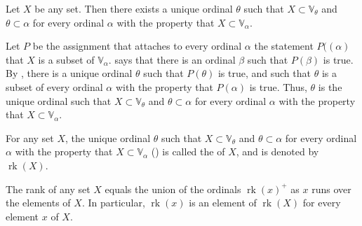 \documentclass{article}
\begin{document}
\begin{theorem}
  \label{thm:l7vz19h3}
  Let \(X\) be any set.  Then there exists a unique ordinal \(\theta\)
  such that \(X \subset \mathbb{V}_\theta\) and
  \(\theta \subset \alpha\) for every ordinal \(\alpha\) with the
  property that \(X \subset \mathbb{V}_\alpha\).
\end{theorem}

Let \(P\) be the assignment that attaches to every ordinal \(\alpha\)
the statement \(P((\alpha)\) that \(X\) is a subset of
\(\mathbb{V}_\alpha\).   says that there is an
ordinal \(\beta\) such that \(P(\beta)\) is true.  By
, there is a unique ordinal \(\theta\) such that
\(P(\theta)\) is true, and such that \(\theta\) is a subset of every
ordinal \(\alpha\) with the property that \(P(\alpha)\) is true.
Thus, \(\theta\) is the unique ordinal such that
\(X \subset \mathbb{V}_\theta\) and \(\theta \subset \alpha\) for
every ordinal \(\alpha\) with the property that
\(X \subset \mathbb{V}_\alpha\).

For any set \(X\), the unique ordinal \(\theta\) such that
\(X \subset \mathbb{V}_\theta\) and \(\theta \subset \alpha\) for
every ordinal \(\alpha\) with the property that
\(X \subset \mathbb{V}_\alpha\) () is called the
 of \(X\), and is denoted by \(\operatorname{rk}(X)\).

\begin{theorem}
  \label{thm:ok93sv3f}
  The rank of any set \(X\) equals the union of the ordinals
  \(\operatorname{rk}(x)^+\) as \(x\) runs over the elements of \(X\).
  In particular, \(\operatorname{rk}(x)\) is an element of
  \(\operatorname{rk}(X)\) for every element \(x\) of \(X\).
\end{theorem}
\end{document}
